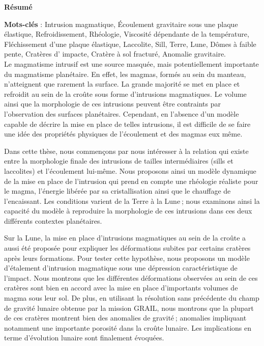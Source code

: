 \thispagestyle{fancy}
\begin{center}
 \Large
 \textbf{Résumé}
\end{center}

\textbf{Mots-clés} : Intrusion magmatique, Écoulement gravitaire sous
une plaque élastique, Refroidissement, Rhéologie, Viscosité dépendante
de la température, Fléchissement d'une plaque élastique, Laccolite,
Sill, Terre, Lune, Dômes à faible pente, Cratères d' impacte, Cratère
à sol fracturé, Anomalie gravitaire.\\

Le magmatisme intrusif est une source masquée, mais potentiellement
importante du magmatisme planétaire. En effet, les magmas, formés au
sein du manteau, n’atteignent que rarement la surface. La grande
majorité se met en place et refroidit au sein de la croûte sous forme
d’intrusions magmatiques. Le volume ainsi que la morphologie de ces
intrusions peuvent être contraints par l’observation des surfaces
planétaires. Cependant, en l’absence d’un modèle capable de décrire la
mise en place de telles intrusions, il est difficile de se faire une
idée des propriétés physiques de l’écoulement et des magmas eux même.

Dans cette thèse, nous commençons par nous intéresser à la relation
qui existe entre la morphologie finale des intrusions de tailles
intermédiaires (sills et laccolites) et l’écoulement lui-même. Nous
proposons ainsi un modèle dynamique de la mise en place de l’intrusion
qui prend en compte une rhéologie réaliste pour le magma, l’énergie
libérée par sa cristallisation ainsi que le chauffage de l’encaissant.
Les conditions varient de la Terre à la Lune ; nous examinons ainsi la
capacité du modèle à reproduire la morphologie de ces intrusions dans
ces deux différents contextes planétaires.

Sur la Lune, la mise en place d’intrusions magmatiques au sein de la
croûte a aussi été proposée pour expliquer les déformations subites
par certains cratères après leurs formations. Pour tester cette
hypothèse, nous proposons un modèle d’étalement d’intrusion magmatique
sous une dépression caractéristique de l’impact. Nous montrons que les
différentes déformations observées au sein de ces cratères sont bien
en accord avec la mise en place d’importants volumes de magma sous
leur sol. De plus, en utilisant la résolution sans précédente du champ
de gravité lunaire obtenue par la mission GRAIL, nous montrons que la
plupart de ces cratères montrent bien des anomalies de gravité ;
anomalies impliquant notamment une importante porosité dans la croûte
lunaire. Les implications en terme d’évolution lunaire sont finalement
évoquées.

